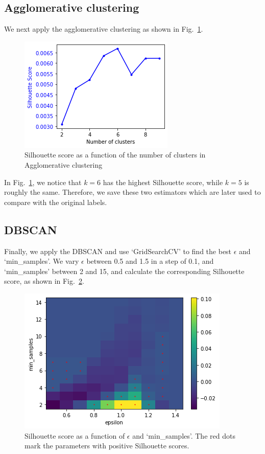 \documentclass{article}
\begin{document}
    \subsection{Agglomerative clustering}
    We next apply the agglomerative clustering as shown in Fig.~\ref{fig:Agg}. 
    
    \begin{figure}[ht]
        \centering
        \includegraphics[width=.5\textwidth]{Agg}
        \caption{Silhouette score as a function of the number of clusters in Agglomerative clustering}
        \label{fig:Agg}
    \end{figure}

    In Fig.~\ref{fig:Agg}, we notice that $k=6$ has the highest Silhouette score, while $k=5$ is roughly the same. Therefore, we save these two estimators which are later used to compare with the original labels. 

    \subsection{DBSCAN}
    Finally, we apply the DBSCAN and use `GridSearchCV' to find the best $\epsilon$ and `min\_samples'. We vary $\epsilon$ between 0.5 and 1.5 in a step of 0.1, and `min\_samples' between 2 and 15, and calculate the corresponding Silhouette score, as shown in Fig.~\ref{fig:dbscan}.

    
    \begin{figure}[ht]
        \centering
        \includegraphics[width=.5\textwidth]{DBSCAN}
        \caption{Silhouette score as a function of $\epsilon$ and `min\_samples'. The red dots mark the parameters with positive Silhouette scores.}
        \label{fig:dbscan}
    \end{figure}
\end{document}
